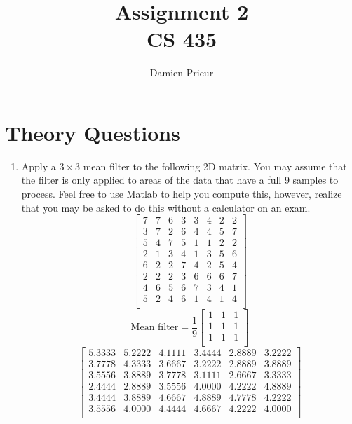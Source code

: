 \documentclass{article}
\author{Damien Prieur}
\title{Assignment 2 \\ CS 435}
\date{}
\begin{document}
\maketitle

\section{Theory Questions}
\begin{enumerate}
\item Apply a $3\times3$ mean filter to the following 2D matrix.  You may assume that the filter is only applied to areas of the data that have a full 9 samples to process.  Feel free to use Matlab to help you compute this, however, realize that you may be asked to do this without a calculator on an exam.
$$
\begin{bmatrix}
7&   7&     6&     3&     3&     4&     2&     2\\
3&   7&     2&     6&     4&     4&     5&     7\\
5&   4&     7&     5&     1&     1&     2&     2\\
2&   1&     3&     4&     1&     3&     5&     6\\
6&   2&     2&     7&     4&     2&     5&     4\\
2&   2&     2&     3&     6&     6&     6&     7\\
4&   6&     5&     6&     7&     3&     4&     1\\
5&   2&     4&     6&     1&     4&     1&     4\\
\end{bmatrix}
$$
$$\text{Mean filter} = \frac{1}{9}
\begin{bmatrix}
1&  1&  1   \\
1&  1&  1   \\
1&  1&  1   \\
\end{bmatrix}
$$
$$
\begin{bmatrix}
5.3333&    5.2222&    4.1111&    3.4444&    2.8889&    3.2222   \\
3.7778&    4.3333&    3.6667&    3.2222&    2.8889&    3.8889   \\
3.5556&    3.8889&    3.7778&    3.1111&    2.6667&    3.3333   \\
2.4444&    2.8889&    3.5556&    4.0000&    4.2222&    4.8889   \\
3.4444&    3.8889&    4.6667&    4.8889&    4.7778&    4.2222   \\
3.5556&    4.0000&    4.4444&    4.6667&    4.2222&    4.0000   \\
\end{bmatrix}
$$



\end{enumerate}
\end{document}
